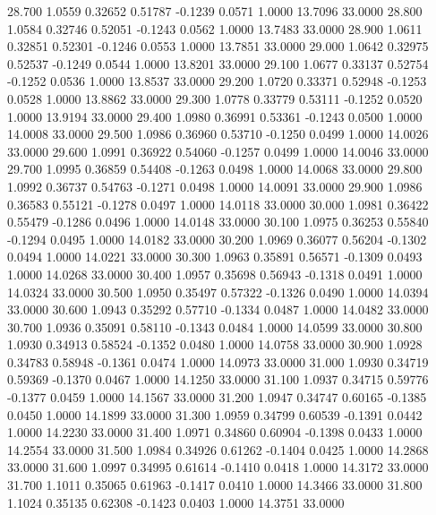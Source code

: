   28.700   1.0559   0.32652   0.51787  -0.1239   0.0571   1.0000  13.7096  33.0000
  28.800   1.0584   0.32746   0.52051  -0.1243   0.0562   1.0000  13.7483  33.0000
  28.900   1.0611   0.32851   0.52301  -0.1246   0.0553   1.0000  13.7851  33.0000
  29.000   1.0642   0.32975   0.52537  -0.1249   0.0544   1.0000  13.8201  33.0000
  29.100   1.0677   0.33137   0.52754  -0.1252   0.0536   1.0000  13.8537  33.0000
  29.200   1.0720   0.33371   0.52948  -0.1253   0.0528   1.0000  13.8862  33.0000
  29.300   1.0778   0.33779   0.53111  -0.1252   0.0520   1.0000  13.9194  33.0000
  29.400   1.0980   0.36991   0.53361  -0.1243   0.0500   1.0000  14.0008  33.0000
  29.500   1.0986   0.36960   0.53710  -0.1250   0.0499   1.0000  14.0026  33.0000
  29.600   1.0991   0.36922   0.54060  -0.1257   0.0499   1.0000  14.0046  33.0000
  29.700   1.0995   0.36859   0.54408  -0.1263   0.0498   1.0000  14.0068  33.0000
  29.800   1.0992   0.36737   0.54763  -0.1271   0.0498   1.0000  14.0091  33.0000
  29.900   1.0986   0.36583   0.55121  -0.1278   0.0497   1.0000  14.0118  33.0000
  30.000   1.0981   0.36422   0.55479  -0.1286   0.0496   1.0000  14.0148  33.0000
  30.100   1.0975   0.36253   0.55840  -0.1294   0.0495   1.0000  14.0182  33.0000
  30.200   1.0969   0.36077   0.56204  -0.1302   0.0494   1.0000  14.0221  33.0000
  30.300   1.0963   0.35891   0.56571  -0.1309   0.0493   1.0000  14.0268  33.0000
  30.400   1.0957   0.35698   0.56943  -0.1318   0.0491   1.0000  14.0324  33.0000
  30.500   1.0950   0.35497   0.57322  -0.1326   0.0490   1.0000  14.0394  33.0000
  30.600   1.0943   0.35292   0.57710  -0.1334   0.0487   1.0000  14.0482  33.0000
  30.700   1.0936   0.35091   0.58110  -0.1343   0.0484   1.0000  14.0599  33.0000
  30.800   1.0930   0.34913   0.58524  -0.1352   0.0480   1.0000  14.0758  33.0000
  30.900   1.0928   0.34783   0.58948  -0.1361   0.0474   1.0000  14.0973  33.0000
  31.000   1.0930   0.34719   0.59369  -0.1370   0.0467   1.0000  14.1250  33.0000
  31.100   1.0937   0.34715   0.59776  -0.1377   0.0459   1.0000  14.1567  33.0000
  31.200   1.0947   0.34747   0.60165  -0.1385   0.0450   1.0000  14.1899  33.0000
  31.300   1.0959   0.34799   0.60539  -0.1391   0.0442   1.0000  14.2230  33.0000
  31.400   1.0971   0.34860   0.60904  -0.1398   0.0433   1.0000  14.2554  33.0000
  31.500   1.0984   0.34926   0.61262  -0.1404   0.0425   1.0000  14.2868  33.0000
  31.600   1.0997   0.34995   0.61614  -0.1410   0.0418   1.0000  14.3172  33.0000
  31.700   1.1011   0.35065   0.61963  -0.1417   0.0410   1.0000  14.3466  33.0000
  31.800   1.1024   0.35135   0.62308  -0.1423   0.0403   1.0000  14.3751  33.0000
